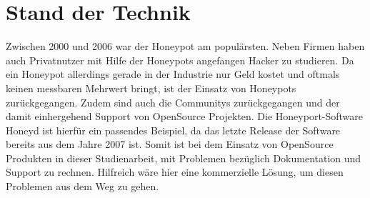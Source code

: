 \section{Stand der Technik}
Zwischen 2000 und 2006 war der Honeypot am populärsten. Neben Firmen haben auch Privatnutzer mit Hilfe der Honeypots angefangen Hacker zu studieren. Da ein Honeypot allerdings gerade in der Industrie nur Geld kostet und oftmals keinen messbaren Mehrwert bringt, ist der Einsatz von Honeypots zurückgegangen. Zudem sind auch die Communitys zurückgegangen und der damit einhergehend Support von OpenSource Projekten. Die Honeyport-Software Honeyd ist hierfür ein passendes Beispiel, da das letzte Release der Software bereits aus dem Jahre 2007 ist. Somit ist bei dem Einsatz von OpenSource Produkten in dieser Studienarbeit, mit Problemen bezüglich Dokumentation und Support zu rechnen. Hilfreich wäre hier eine kommerzielle Lösung, um diesen Problemen aus dem Weg zu gehen. 